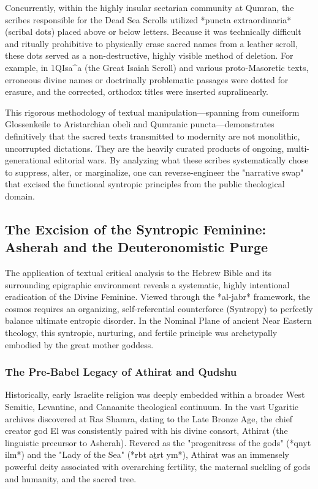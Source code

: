 \documentclass[aps,prd,11pt,onecolumn,superscriptaddress,nofootinbib,floatfix]{revtex4-2}
\begin{document}
Concurrently, within the highly insular sectarian community at Qumran, the scribes responsible for the Dead Sea Scrolls utilized *puncta extraordinaria* (scribal dots) placed above or below letters. Because it was technically difficult and ritually prohibitive to physically erase sacred names from a leather scroll, these dots served as a non-destructive, highly visible method of deletion. For example, in 1QIsa\textasciicircum{}a (the Great Isaiah Scroll) and various proto-Masoretic texts, erroneous divine names or doctrinally problematic passages were dotted for erasure, and the corrected, orthodox titles were inserted supralinearly.


This rigorous methodology of textual manipulation---spanning from cuneiform Glossenkeile to Aristarchian obeli and Qumranic puncta---demonstrates definitively that the sacred texts transmitted to modernity are not monolithic, uncorrupted dictations. They are the heavily curated products of ongoing, multi-generational editorial wars. By analyzing what these scribes systematically chose to suppress, alter, or marginalize, one can reverse-engineer the "narrative swap" that excised the functional syntropic principles from the public theological domain.


\subsection{The Excision of the Syntropic Feminine: Asherah and the Deuteronomistic Purge}
The application of textual critical analysis to the Hebrew Bible and its surrounding epigraphic environment reveals a systematic, highly intentional eradication of the Divine Feminine. Viewed through the *al-jabr* framework, the cosmos requires an organizing, self-referential counterforce (Syntropy) to perfectly balance ultimate entropic disorder. In the Nominal Plane of ancient Near Eastern theology, this syntropic, nurturing, and fertile principle was archetypally embodied by the great mother goddess.


\subsubsection{The Pre-Babel Legacy of Athirat and Qudshu}
Historically, early Israelite religion was deeply embedded within a broader West Semitic, Levantine, and Canaanite theological continuum. In the vast Ugaritic archives discovered at Ras Shamra, dating to the Late Bronze Age, the chief creator god El was consistently paired with his divine consort, Athirat (the linguistic precursor to Asherah). Revered as the "progenitress of the gods" (*qnyt ilm*) and the "Lady of the Sea" (*rbt aṯrt ym*), Athirat was an immensely powerful deity associated with overarching fertility, the maternal suckling of gods and humanity, and the sacred tree.
\end{document}

